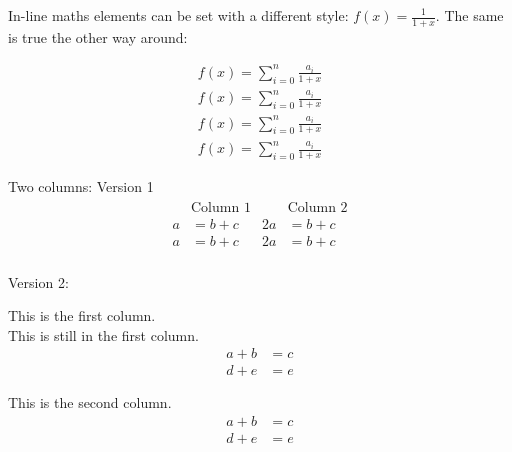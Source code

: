 \documentclass[12pt, a4paper, twopage]{scrartcl}
\begin{document}
In-line maths elements can be set with a different style: \(f(x) = \displaystyle \frac{1}{1+x}\). The same is true the other way around:

\begin{eqnarray*}
	f(x) = \sum_{i=0}^{n} \frac{a_i}{1+x} \\
	\textstyle f(x) = \textstyle \sum_{i=0}^{n} \frac{a_i}{1+x} \\
	\scriptstyle f(x) = \scriptstyle \sum_{i=0}^{n} \frac{a_i}{1+x} \\
	\scriptscriptstyle f(x) = \scriptscriptstyle \sum_{i=0}^{n} \frac{a_i}{1+x}
\end{eqnarray*}


Two columns: Version 1
\begin{align}
	\begin{split}
		&\text{Column 1}\\
		a &= b+c\\
		a &= b+c\\
	\end{split}
	\begin{split}
		& \text{Column 2}\\
		2a &= b+c\\
		2a &= b+c\\
	\end{split}
\end{align}

Version 2:

\begin{minipage}[t]{0.4\textwidth}
	This is the first column.\\
	
	This is still in the first column.
	\begin{align}
	a+b &= c\\
	d+e &= e
	\end{align}
\end{minipage}
%
%
\begin{minipage}[t]{0.4\textwidth}
	This is the second column.
	\begin{align}
	a+b &= c\\
	d+e &= e
	\end{align}
\end{minipage}
\end{document}
